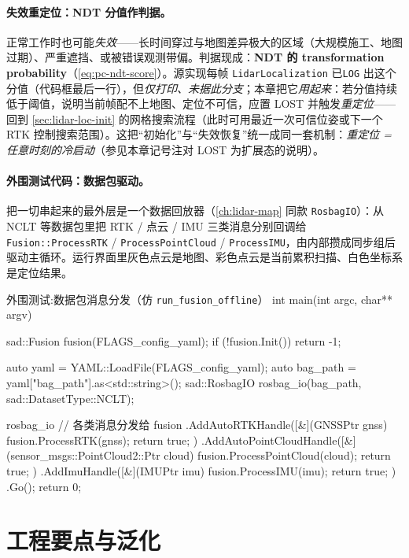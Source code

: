 \paragraph{失效重定位：NDT 分值作判据。}
正常工作时也可能\emph{失效}——长时间穿过与地图差异极大的区域（大规模施工、地图过期）、严重遮挡、或被错误观测带偏。判据现成：\textbf{NDT 的 transformation probability}（\cref{eq:pc-ndt-score}）。源实现每帧 \texttt{LidarLocalization} 已\texttt{LOG} 出这个分值（代码框最后一行），但\emph{仅打印、未据此分支}；本章把它\emph{用起来}：若分值持续低于阈值，说明当前帧配不上地图、定位不可信，应置 \textsf{LOST} 并触发\emph{重定位}——回到 \cref{sec:lidar-loc-init} 的网格搜索流程（此时可用最近一次可信位姿或下一个 RTK 控制搜索范围）。这把“初始化”与“失效恢复”统一成同一套机制：\emph{重定位 = 任意时刻的冷启动}（参见本章记号注对 \textsf{LOST} 为扩展态的说明）。

\paragraph{外围测试代码：数据包驱动。}
把一切串起来的最外层是一个数据回放器（\cref{ch:lidar-map} 同款 \texttt{RosbagIO}）：从 NCLT 等数据包里把 RTK / 点云 / IMU 三类消息分别回调给 \texttt{Fusion::ProcessRTK} / \texttt{ProcessPointCloud} / \texttt{ProcessIMU}，由内部攒成同步组后驱动主循环。运行界面里灰色点云是地图、彩色点云是当前累积扫描、白色坐标系是定位结果。

\begin{codebox}[C++]{外围测试:数据包消息分发（仿 \texttt{run\_fusion\_offline}）}
int main(int argc, char** argv) {
  sad::Fusion fusion(FLAGS_config_yaml);
  if (!fusion.Init()) return -1;

  auto yaml = YAML::LoadFile(FLAGS_config_yaml);
  auto bag_path = yaml["bag_path"].as<std::string>();
  sad::RosbagIO rosbag_io(bag_path, sad::DatasetType::NCLT);

  rosbag_io                                            // 各类消息分发给 fusion
    .AddAutoRTKHandle([&](GNSSPtr gnss)  { fusion.ProcessRTK(gnss);  return true; })
    .AddAutoPointCloudHandle([&](sensor_msgs::PointCloud2::Ptr cloud) {
        fusion.ProcessPointCloud(cloud); return true; })
    .AddImuHandle([&](IMUPtr imu)        { fusion.ProcessIMU(imu);   return true; })
    .Go();
  return 0;
}
\end{codebox}

\section{工程要点与泛化}
\label{sec:lidar-loc-eng}

